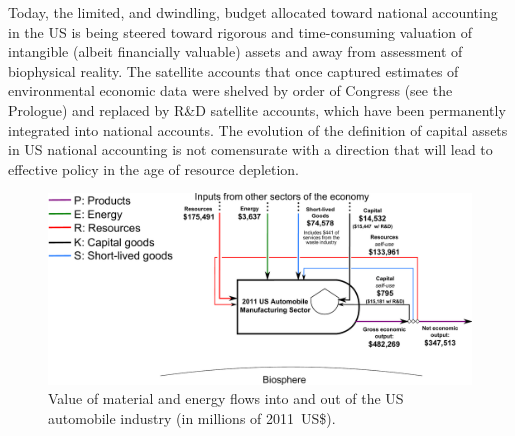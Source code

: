 Today, the limited, and dwindling, 
budget allocated toward national
accounting in the US is being steered toward
rigorous and time-consuming 
valuation of intangible (albeit financially valuable) assets
and away from assessment of biophysical reality.
The satellite accounts that once
captured estimates of environmental economic
data were shelved by order of Congress (see the Prologue) and
replaced by R\&D satellite accounts, which 
have been permanently integrated into national accounts. 
The evolution of the definition of capital assets in US national accounting
is not comensurate with a direction that will lead to effective policy 
in the age of resource depletion. 

\begin{landscape}
\begin{figure}[!ht]
\centering
\includegraphics[width=0.8\linewidth]{Part_2/Chapter_Values/images/PERKS_basic_unit_value_auto_ind.pdf}
\caption[Value of material and energy flows 
into and out of the US automobile industry]{Value 
of material and energy flows into and out of the 
US automobile industry (in millions of 2011~US\$).}
\label{fig:PERKS_value_auto_ind}
\end{figure}
\end{landscape}

